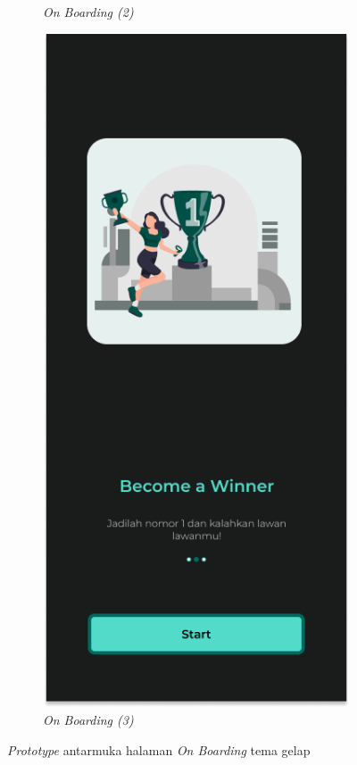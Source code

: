 \begin{figure}[H]
\begin{subfigure}[b]{0.23\textwidth}
	  \caption{\textit{On Boarding (2)}}
	  \label{fig:HasilBoarding2-dt}
	\end{subfigure}
	\begin{subfigure}[b]{0.23\textwidth}
		\centering
	  \includegraphics[width=\linewidth]{contents/chapter-3/images/HF-Boarding-3-dt.png}
	  \caption{\textit{On Boarding (3)}}
	  \label{fig:HasilBoarding3-dt}
	\end{subfigure}
	\caption{\textit{Prototype} antarmuka halaman \textit{On Boarding} tema gelap}
	\label{Fig:HasilFeatureSetBoarding-dt}
\end{figure}
